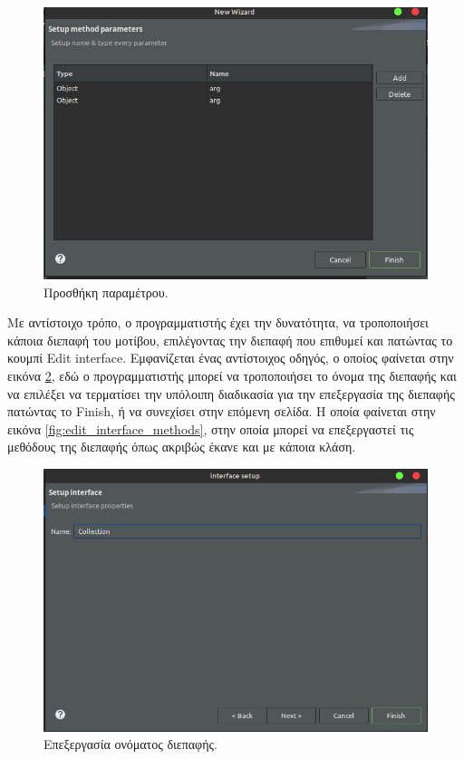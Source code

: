 \begin{figure}[H]
    \centering
    \includegraphics[width=1.0\textwidth]{Figures/add_parameters.png}
    \caption{Προσθήκη παραμέτρου.}
    \label{fig:add_parameters}
\end{figure}
Με αντίστοιχο τρόπο, ο προγραμματιστής έχει την δυνατότητα, να τροποποιήσει κάποια διεπαφή του μοτίβου, 
επιλέγοντας την διεπαφή που επιθυμεί και πατώντας το κουμπί Edit interface. Εμφανίζεται ένας αντίστοιχος οδηγός, ο οποίος φαίνεται 
στην εικόνα \ref{fig:edit_interface}, εδώ ο προγραμματιστής μπορεί να τροποποιήσει το όνομα της διεπαφής 
και να επιλέξει να τερματίσει την υπόλοιπη διαδικασία για την επεξεργασία της διεπαφής πατώντας το Finish, ή να συνεχίσει στην επόμενη 
σελίδα. Η οποία φαίνεται στην εικόνα \ref{fig:edit_interface_methods}, στην οποία μπορεί να 
επεξεργαστεί τις μεθόδους της διεπαφής όπως ακριβώς έκανε και με κάποια κλάση.
\begin{figure}[H]
    \centering
    \includegraphics[width=1.0\textwidth]{Figures/edit_interface.png}
    \caption{Επεξεργασία ονόματος διεπαφής.}
    \label{fig:edit_interface}
\end{figure}
